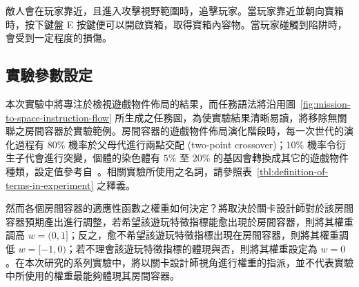 敵人會在玩家靠近，且進入攻擊視野範圍時，追擊玩家。當玩家靠近並朝向寶箱時，按下鍵盤 E 按鍵便可以開啟寶箱，取得寶箱內容物。當玩家碰觸到陷阱時，會受到一定程度的損傷。







\subsection{實驗參數設定}
\label{ssec:experiment-parameters}

本次實驗中將專注於檢視遊戲物件佈局的結果，而任務語法將沿用圖~\ref{fig:mission-to-space-instruction-flow} 所生成之任務圖，為使實驗結果清晰易讀，將移除無關聯之房間容器於實驗範例。房間容器的遊戲物件佈局演化階段時，每一次世代的演化過程有 $80\%$ 機率於父母代進行兩點交配 (two-point crossover)；$10\%$ 機率令衍生子代會進行突變，個體的染色體有 $5\%$ 至 $20\%$ 的基因會轉換成其它的遊戲物件種類，設定值參考自~\cite{liapis2017multi}。相關實驗所使用之名詞，請參照表~\ref{tbl:definition-of-terms-in-experiment} 之釋義。

然而各個房間容器的適應性函數之權重如何決定？將取決於關卡設計師對於該房間容器預期產出進行調整，若希望該遊玩特徵指標能愈出現於房間容器，則將其權重調高 $w = (0, 1]$；反之，愈不希望該遊玩特徵指標出現在房間容器，則將其權重調低 $w = [-1, 0)$；若不理會該遊玩特徵指標的體現與否，則將其權重設定為 $w = 0$。在本次研究的系列實驗中，將以關卡設計師視角進行權重的指派，並不代表實驗中所使用的權重最能夠體現其房間容器。


